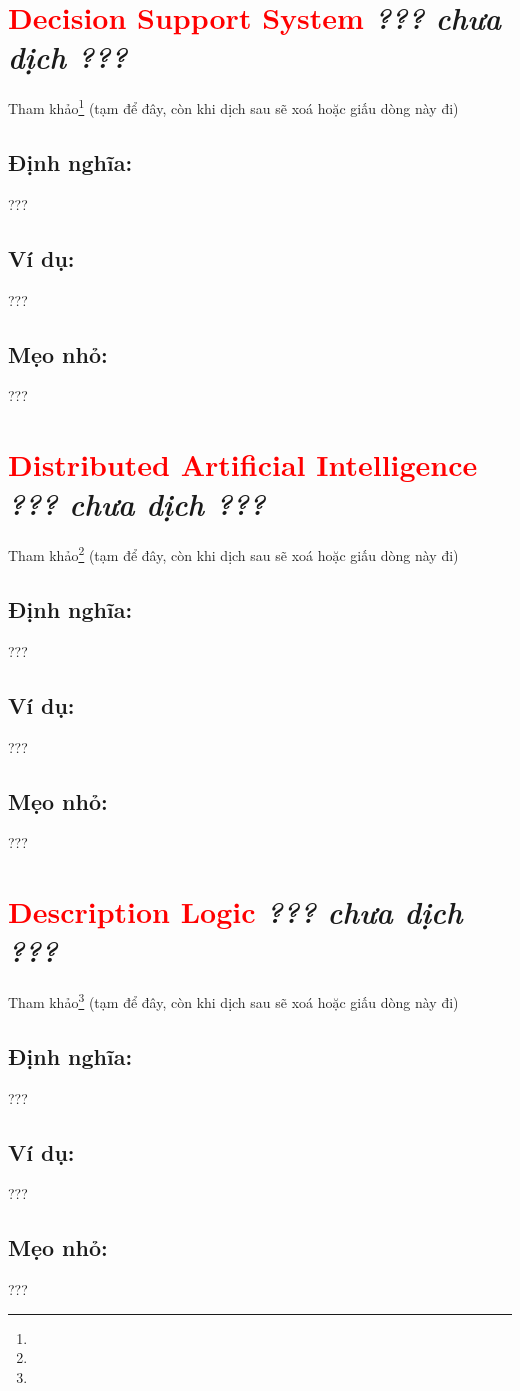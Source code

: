 \section*{\huge \textcolor{Red}{Decision Support System}  \small \textit{??? chưa dịch ???} }
Tham khảo\footnote{} (tạm để đây, còn khi dịch sau sẽ xoá hoặc giấu dòng này đi)
\subsection*{Định nghĩa:}
???
\subsection*{Ví dụ:}
???
\subsection*{Mẹo nhỏ:}
???
\section*{\huge \textcolor{Red}{Distributed Artificial Intelligence}  \small \textit{??? chưa dịch ???} }
Tham khảo\footnote{} (tạm để đây, còn khi dịch sau sẽ xoá hoặc giấu dòng này đi)
\subsection*{Định nghĩa:}
???
\subsection*{Ví dụ:}
???
\subsection*{Mẹo nhỏ:}
???
\section*{\huge \textcolor{Red}{Description Logic}  \small \textit{??? chưa dịch ???} }
Tham khảo\footnote{} (tạm để đây, còn khi dịch sau sẽ xoá hoặc giấu dòng này đi)
\subsection*{Định nghĩa:}
???
\subsection*{Ví dụ:}
???
\subsection*{Mẹo nhỏ:}
???
